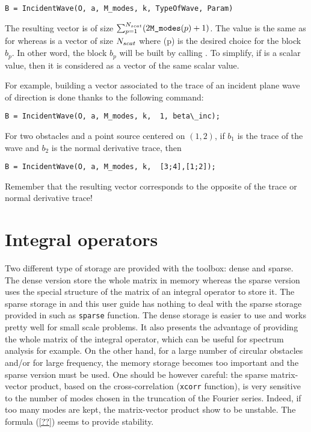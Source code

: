 \begin{verbatim}
B = IncidentWave(O, a, M_modes, k, TypeOfWave, Param)
\end{verbatim}
The resulting vector  is of size $\sum_{p=1}^{N_{scat}}(2\texttt{M\_modes}(p)+1)$. The value  is the same as for  whereas  is a vector of size $N_{scat}$ where (p) is the desired choice for the block $b_p$. In other word, the block $b_p$ will be built by calling . To simplify, if  is a scalar value, then it is considered as a vector of the same scalar value.

For example, building a vector associated to the trace of an incident plane wave of direction  is done thanks to the following command:
\begin{verbatim}
B = IncidentWave(O, a, M_modes, k,  1, beta\_inc);
\end{verbatim}
For two obstacles and a point source centered on $(1,2)$, if $b_1$ is the trace of the wave and $b_2$ is the normal derivative trace, then
\begin{verbatim}
B = IncidentWave(O, a, M_modes, k,  [3;4],[1;2]);
\end{verbatim}

\begin{remark}
Remember that the resulting vector corresponds to the opposite of the trace or normal derivative trace!
\end{remark}


\section{Integral operators}

Two different type of storage are provided with the \mudiff toolbox: dense and sparse. The dense version store the whole matrix in memory whereas the sparse version uses the special structure of the matrix of an integral operator to store it. The sparse storage in \mudiff and this user guide has nothing to deal with the sparse storage provided in \matlab such as \texttt{sparse} function. The dense storage is easier to use and works pretty well for small scale problems. It also presents the advantage of providing the whole matrix of the integral operator, which can be useful for spectrum analysis for example. On the other hand, for a large number of circular obstacles and/or for large frequency, the memory storage becomes too important and the sparse version must be used. One should be however careful: the sparse matrix-vector product, based on the cross-correlation (\texttt{xcorr} \matlab function), is very sensitive to the number of modes chosen in the truncation of the Fourier series. Indeed, if too many modes are kept, the matrix-vector product show to be unstable. The formula (\ref{??}) seems to provide stability.

